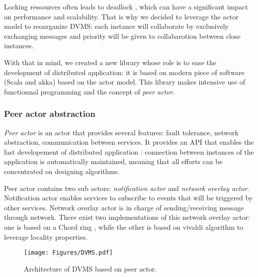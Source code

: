 Locking ressources often leads to deadlock \cite{agha:1986}, which can have
a significant impact on performance and scalability. That is why we decided to
leverage the actor model to reoarganize DVMS: each instance will collaborate
by exclusively exchanging messages and priority will be given to collabarotion
between close instances.

With that in mind, we created a new library whose role is to ease the
development of distributed application: it is based on modern piece of software (Scala and akka) based on the actor model. This library makes intensive use of
functionnal programming and the concept of \emph{peer actor}.

\subsubsection{Peer actor abstraction}

\emph{Peer actor} is an actor that provides several features: fault tolerance,
network abstraction, communication between services. It provides an API that 
enables the fast developement of distributed application : connection between
instances of the application is automatically maintained, meaning that all 
efforts can be concentrated on designing algorithms.

Peer actor contains two sub actors: \emph{notification actor} and \emph{network
overlay actor}. Notification actor enables services to subscribe to events that
will be triggered by other services. Network overlay actor is in charge of 
sending/receiving message through network. There exist two implementations of 
this network overlay actor: one is based on a Chord ring \cite{stoica2001chord}, while the other is 
based on vivaldi algorithm to leverage locality properties.

\begin{figure}[h!]
  \centering
  \texttt{[image: Figures/DVMS.pdf]}
  \caption{Architecture of DVMS based on peer actor.}%
  \label{fig:isp}%
\end{figure}

